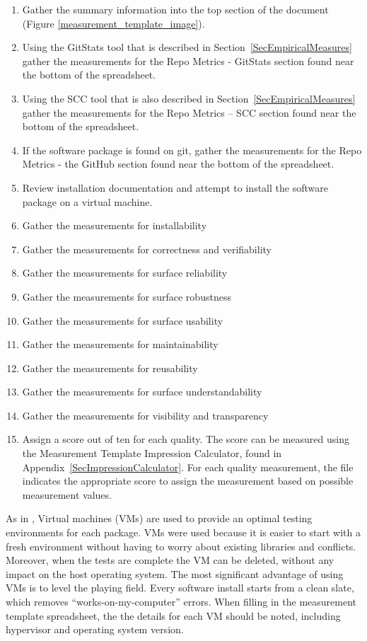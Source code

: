 \documentclass[letterpaper,cleveref]{lipics-v2019}
\begin{document}
\begin{enumerate}
\item Gather the summary information into the top section of the document
  (Figure \ref{measurement_template_image}).
\item Using the GitStats tool that is described in
  Section~\ref{SecEmpiricalMeasures} gather the measurements for the Repo
  Metrics - GitStats section found near the bottom of the spreadsheet.
\item Using the SCC tool that is also described in
  Section~\ref{SecEmpiricalMeasures} gather the measurements for the Repo
  Metrics -- SCC section found near the bottom of the spreadsheet.
\item If the software package is found on git, gather the measurements for the
  Repo Metrics - the GitHub section found near the bottom of the spreadsheet.
\item Review installation documentation and attempt to install the software
  package on a virtual machine.
\item Gather the measurements for installability
\item Gather the measurements for correctness and verifiability
\item Gather the measurements for surface reliability
\item Gather the measurements for surface robustness
\item Gather the measurements for surface usability
\item Gather the measurements for maintainability
\item Gather the measurements for reusability
\item Gather the measurements for surface understandability
\item Gather the measurements for visibility and transparency
\item Assign a score out of ten for each quality. The score can be measured
  using the Measurement Template Impression Calculator, found in
  Appendix~\ref{SecImpressionCalculator}. For each quality measurement, the file
  indicates the appropriate score to assign the measurement based on possible
  measurement values.
\end{enumerate}

As in \citet{SmithEtAl2016}, Virtual machines (VMs) are used to provide an
optimal testing environments for each package. VMs were used because it is
easier to start with a fresh environment without having to worry about existing
libraries and conflicts. Moreover, when the tests are complete the VM can be
deleted, without any impact on the host operating system. The most significant
advantage of using VMs is to level the playing field. Every software install
starts from a clean slate, which removes ``works-on-my-computer'' errors. When
filling in the measurement template spreadsheet, the the details for each VM
should be noted, including hypervisor and operating system version.
\end{document}
